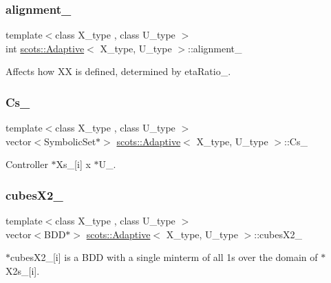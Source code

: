 \subsubsection{\texorpdfstring{alignment\+\_\+}{alignment\_}}
{\footnotesize\ttfamily template$<$class X\+\_\+type , class U\+\_\+type $>$ \\
int \hyperlink{classscots_1_1Adaptive}{scots\+::\+Adaptive}$<$ X\+\_\+type, U\+\_\+type $>$\+::alignment\+\_\+}

Affects how XX is defined, determined by eta\+Ratio\+\_\+. \mbox{\label{classscots_1_1Adaptive_a4937d441ac9758f33bcceeb9975fb1ce}} 
\subsubsection{\texorpdfstring{Cs\+\_\+}{Cs\_}}
{\footnotesize\ttfamily template$<$class X\+\_\+type , class U\+\_\+type $>$ \\
vector$<$Symbolic\+Set$\ast$$>$ \hyperlink{classscots_1_1Adaptive}{scots\+::\+Adaptive}$<$ X\+\_\+type, U\+\_\+type $>$\+::Cs\+\_\+}

Controller  $\ast$\+Xs\+\_\+\mbox{[}i\mbox{]} x $\ast$\+U\+\_\+. \mbox{\label{classscots_1_1Adaptive_a6fa7b7542b91ec37ff2358359e425d12}} 
\subsubsection{\texorpdfstring{cubes\+X2\+\_\+}{cubesX2\_}}
{\footnotesize\ttfamily template$<$class X\+\_\+type , class U\+\_\+type $>$ \\
vector$<$B\+DD$\ast$$>$ \hyperlink{classscots_1_1Adaptive}{scots\+::\+Adaptive}$<$ X\+\_\+type, U\+\_\+type $>$\+::cubes\+X2\+\_\+}

$\ast$cubes\+X2\+\_\+\mbox{[}i\mbox{]} is a B\+DD with a single minterm of all 1s over the domain of $\ast$\+X2s\+\_\+\mbox{[}i\mbox{]}. \mbox{\label{classscots_1_1Adaptive_ac82296bd0392bccf2a0e4af9ba70ff37}} 
